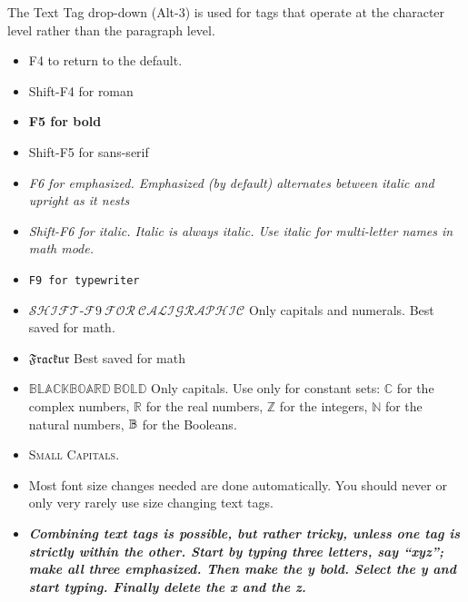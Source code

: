 The Text Tag drop-down (Alt-3) is used for tags that operate at the
character level rather than the paragraph level.

\begin{itemize}
\item F4 to return to the default.

\item \textrm{Shift-F4 for roman}

\item \textbf{F5 for bold}

\item \textsf{Shift-F5 for sans-serif}

\item \emph{F6 for emphasized. Emphasized (by default) alternates between
italic and upright as it nests}

\item \textit{Shift-F6 for italic. Italic is always italic. Use italic for
multi-letter names in math mode.}

\item \texttt{F9 for typewriter}

\item $\mathcal{SHIFT}$-$\mathcal{F}9~\mathcal{FOR\ CALIGRAPHIC}$ Only
capitals and numerals. Best saved for math.

\item $\mathfrak{Frackur}$ Best saved for math

\item $\mathbb{BLACKBOARD\ BOLD}$ Only capitals. Use only for constant sets: 
$\mathbb{C}$ for the complex numbers, $\mathbb{R}$ for the real numbers, $%
\mathbb{Z}$ for the integers, $\mathbb{N}$ for the natural numbers, $\mathbb{%
B}$ for the Booleans.

\item \textsc{Small Capitals}.

\item Most font size changes needed are done automatically. You should never
or only very rarely use {\Huge size} {\scriptsize changing} {\LARGE text} 
{\tiny tags}.

\item \emph{\textbf{Combining text tags is possible, but rather tricky,
unless one tag is strictly within the other. Start by typing three letters,
say \textquotedblleft xyz\textquotedblright ; make all three emphasized.
Then make the y bold. Select the y and start typing. Finally delete the x
and the z.}}
\end{itemize}

